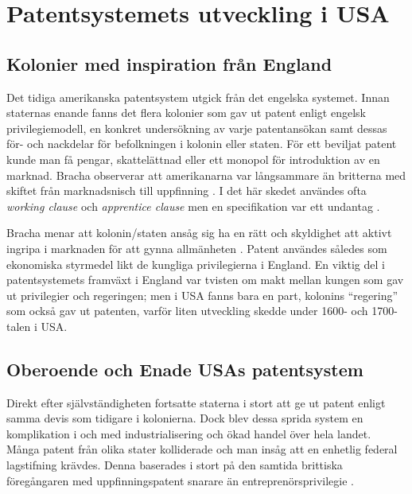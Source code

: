 \section{Patentsystemets utveckling i USA} 
\label{sec:usa}

\subsection{Kolonier med inspiration från England}

Det tidiga amerikanska patentsystem utgick från det engelska systemet. Innan staternas enande fanns det
flera kolonier som gav ut patent enligt engelsk privilegiemodell, en konkret undersökning av varje
patentansökan samt dessas för- och nackdelar för befolkningen i kolonin eller staten. För ett beviljat
patent kunde man få pengar, skattelättnad eller ett monopol för introduktion av en marknad. Bracha
observerar att amerikanarna var långsammare än britterna med skiftet från marknadsnisch till
uppfinning \cite{bracha}. I det här skedet användes ofta \emph{working clause} och \emph{apprentice
clause} men en specifikation var ett undantag \cite{bracha}.

Bracha menar att kolonin/staten ansåg sig ha en rätt och skyldighet att aktivt ingripa i marknaden
för att gynna allmänheten \cite{bracha}. Patent användes således som ekonomiska styrmedel likt de
kungliga privilegierna i England. En viktig del i patentsystemets framväxt i England var tvisten om makt
mellan kungen som gav ut privilegier och regeringen; men i USA fanns bara en part, kolonins ``regering''
som också gav ut patenten, varför liten utveckling skedde under 1600- och 1700-talen i USA.



\subsection{Oberoende och Enade USAs patentsystem}

Direkt efter självständigheten fortsatte staterna i stort att ge ut patent enligt samma devis som tidigare i
kolonierna. Dock blev dessa sprida system en komplikation i och med industrialisering och ökad handel över
hela landet. Många patent från olika stater kolliderade och man insåg att en enhetlig federal
lagstifning krävdes. Denna baserades i stort på den samtida brittiska föregångaren med uppfinningspatent
snarare än entreprenörsprivilegie \cite{nard}.

